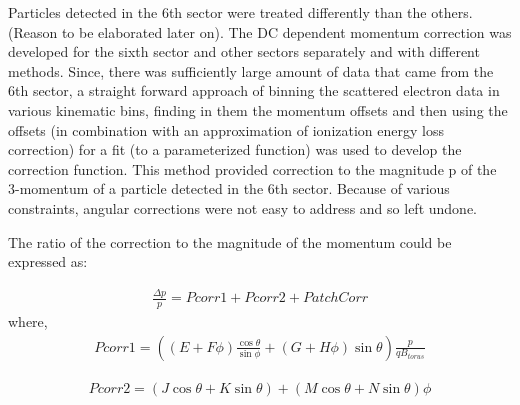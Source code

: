Particles detected in the 6th sector were treated differently than the others. (Reason to be elaborated later on). The DC dependent momentum correction was developed for the sixth sector and other sectors separately and with different methods. Since, there was sufficiently large amount of data that came from the 6th sector, a straight forward approach of binning the scattered electron data in various kinematic bins, finding in them the momentum offsets and then using the offsets (in combination with an approximation of ionization energy loss correction) for a fit (to a parameterized function) was used to develop the correction function. This method provided correction to the magnitude p of the 3-momentum of a particle detected in the 6th sector. Because of various constraints, angular corrections were not easy to address and so left undone.

The ratio of the correction to the magnitude of the momentum could be expressed as: 

\begin{eqnarray}
\label{eqPCor}
\frac{\Delta p}{p} = Pcorr1 + Pcorr2 + PatchCorr
\end{eqnarray}
where,
\begin{eqnarray}
\label{eqPCor1}
Pcorr1 = \left( (E+F\phi)\frac{\cos\theta}{\sin\phi} + (G+H\phi)\sin\theta   \right) \frac{p}{qB_{torus}} %
\end{eqnarray}


\begin{eqnarray}
\label{eqPCor2}
Pcorr2 = (J \cos\theta + K \sin\theta) + (M \cos\theta+N \sin\theta)\phi
\end{eqnarray}

